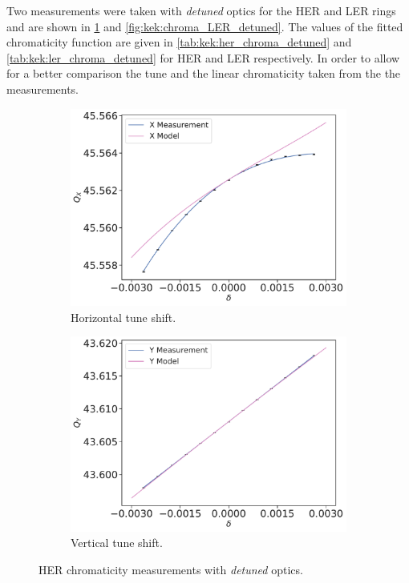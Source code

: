 Two measurements were taken with \textit{detuned} optics for the HER and LER rings and are shown 
in \cref{fig:kek:chroma_HER_detuned} and \cref{fig:kek:chroma_LER_detuned}. The values of the fitted
chromaticity function are given in \cref{tab:kek:her_chroma_detuned} and
\cref{tab:kek:ler_chroma_detuned} for HER and LER respectively. In order to allow for a better
comparison the tune and the linear chromaticity taken from the the measurements.

\begin{figure}[!htb]
    \centering
    \begin{subfigure}[b]{0.49\textwidth}
        \includegraphics[width=\linewidth]{images/kek/chromaticity/HER_09/qx_modelq0q1.pdf}
        \caption{Horizontal tune shift.}
    \end{subfigure}
    \begin{subfigure}[b]{0.49\textwidth}
        \includegraphics[width=\linewidth]{images/kek/chromaticity/HER_09/qy_modelq0q1.pdf}
        \caption{Vertical tune shift.}
    \end{subfigure}
    \caption{HER chromaticity measurements with \textit{detuned} optics.}
    \label{fig:kek:chroma_HER_detuned}
\end{figure}

